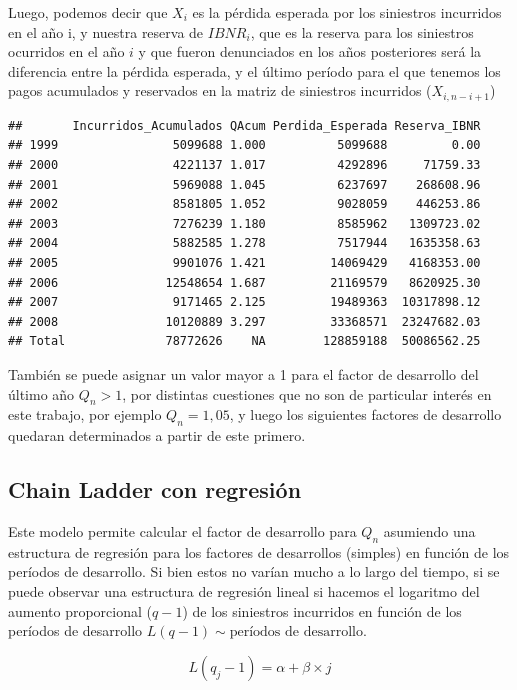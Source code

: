 \documentclass[
  12pt,
]{article}
\begin{document}
Luego, podemos decir que \(X_i\) es la pérdida esperada por los
siniestros incurridos en el año i, y nuestra reserva de \(IBNR_i\), que
es la reserva para los siniestros ocurridos en el año \(i\) y que fueron
denunciados en los años posteriores será la diferencia entre la pérdida
esperada, y el último período para el que tenemos los pagos acumulados y
reservados en la matriz de siniestros incurridos (\(X_{i,n-i+1}\))

\begin{verbatim}
##       Incurridos_Acumulados QAcum Perdida_Esperada Reserva_IBNR
## 1999                5099688 1.000          5099688         0.00
## 2000                4221137 1.017          4292896     71759.33
## 2001                5969088 1.045          6237697    268608.96
## 2002                8581805 1.052          9028059    446253.86
## 2003                7276239 1.180          8585962   1309723.02
## 2004                5882585 1.278          7517944   1635358.63
## 2005                9901076 1.421         14069429   4168353.00
## 2006               12548654 1.687         21169579   8620925.30
## 2007                9171465 2.125         19489363  10317898.12
## 2008               10120889 3.297         33368571  23247682.03
## Total              78772626    NA        128859188  50086562.25
\end{verbatim}

También se puede asignar un valor mayor a 1 para el factor de desarrollo
del último año \(Q_n>1\), por distintas cuestiones que no son de
particular interés en este trabajo, por ejemplo \(Q_n=1,05\), y luego
los siguientes factores de desarrollo quedaran determinados a partir de
este primero.

\hypertarget{chain-ladder-con-regresiuxf3n}{%
\subsection{Chain Ladder con
regresión}\label{chain-ladder-con-regresiuxf3n}}

Este modelo permite calcular el factor de desarrollo para \(Q_n\)
asumiendo una estructura de regresión para los factores de desarrollos
(simples) en función de los períodos de desarrollo. Si bien estos no
varían mucho a lo largo del tiempo, si se puede observar una estructura
de regresión lineal si hacemos el logaritmo del aumento proporcional
(\(q-1\)) de los siniestros incurridos en función de los períodos de
desarrollo \(L(q-1) \sim \text{períodos de desarrollo}\).

\[
L(q_j -1) = \alpha + \beta\times j
\]
\end{document}
